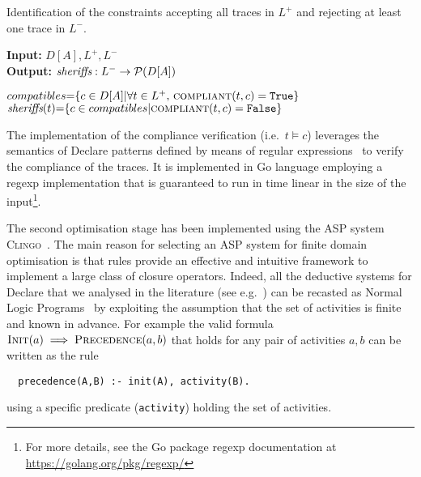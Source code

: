 \makeatletter
\algrenewcommand\ALG@beginalgorithmic{\footnotesize}
\makeatother

\begin{algorithm}
    \caption{Identification of the constraints accepting all traces in $L^+$ and rejecting at least one trace in $L^-$.}
    \label{algcand}
    \textbf{Input:}  $D[A], L^+, L^-$\\
    \textbf{Output:} $\textit{sheriffs} : L^- \rightarrow \mathcal{P}({D[A]})$
    	\begin{algorithmic}[1] 
   	\State ${compatibles}{=}\{c \in D[A]| \forall t \in L^+,\, \Call{compliant}{t,c} = \texttt{True}\}$ 
	\label{algcand:candidates}
		\State $\textit{\sheriff}(t){=}\{c \in {compatibles} | \Call{compliant}{t,c} = \texttt{False}\}$\label{algcand:choices}
	\EndFor
	\State \Return \textit{\sheriff}
    \EndProcedure
    \end{algorithmic}
\end{algorithm}

\makeatletter
\algrenewcommand\ALG@beginalgorithmic{\normalsize}
\makeatother

The implementation of the compliance verification  (i.e.\ $t\models c$) leverages the semantics of Declare patterns defined by means of regular expressions \cite{2017-DiCiccio}%
~to verify the compliance of the traces. It is implemented in Go language employing a regexp implementation that is guaranteed to run in time linear in the size of the input\footnote{For more details, see the Go package regexp documentation at \url{https://golang.org/pkg/regexp/}}.
\lstset{language=Prolog}

The second optimisation stage has been implemented using the \ac{ASP} system \textsc{Clingo}~\cite{DBLP:journals/corr/GebserKKS14}. The main reason for selecting an \ac{ASP} system for finite domain optimisation is that rules provide an effective and intuitive framework to implement a large class of closure operators. Indeed, all the deductive systems for Declare that we analysed in the literature (see e.g.~\cite{2016-Bernardi,2017-DiCiccio}) can be recasted as Normal Logic Programs~\cite{2008-Lifschitz} by exploiting the assumption that the set of activities is finite and known in advance.
%
For example the valid formula $\textsc{Init}(a)\implies\textsc{Precedence}(a,b)$ that holds for any pair of activities $a, b$ can be written as the rule
\begin{lstlisting}
  precedence(A,B) :- init(A), activity(B).
\end{lstlisting}
using a specific predicate (\lstinline{activity}) holding the set of activities.


